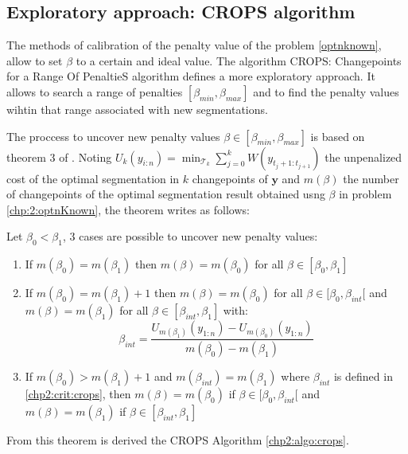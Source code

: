 \subsection{Exploratory approach: CROPS algorithm}

The methods of calibration of the penalty value of the problem \ref{optnknown}, allow to set $\beta$ to a certain and ideal value. The algorithm CROPS: Changepoints for a Range Of PenaltieS algorithm defines a more exploratory approach. It allows to search a range of penalties $[\beta_{min},\beta_{max}]$ and to find the penalty values wihtin that range associated with new segmentations.  

The proccess to uncover new penalty values $\beta \in [\beta_{min},\beta_{max}]$ is based on theorem 3 of \cite{haynes2017}. Noting $U_k(y_{i:n}) = \min_{\mathcal{T}_k} \sum_{j = 0}^k W(y _{t_j+1:t_{j+1}})$ the unpenalized cost of the optimal segmentation in $k$ changepoints of $\bm y$ and $m(\beta)$ the number of changepoints of the optimal segmentation result obtained usng $\beta$ in problem \ref{chp:2:optnKnown}, the theorem writes as follows:

\begin{theorem}
Let $\beta_0 < \beta_1$, 3 cases are possible to uncover new penalty values:
\begin{enumerate}
  \item If $m(\beta_0) = m(\beta_1)$ then $m(\beta) = m(\beta_0)$ for all $\beta \in [\beta_0,\beta_1]$
  \item If $m(\beta_0) = m(\beta_1)+1$ then $m(\beta) = m(\beta_0)$ for all $\beta\in[\beta_0,\beta_{int}[$ and $m(\beta) = m(\beta_1)$ for all $\beta\in[\beta_{int},\beta_1]$ with:
  \begin{equation}\label{chp2:crit:crops}
    \beta_{int} = \frac{U_{m(\beta_1)}(y_{1:n})-U_{m(\beta_0)}(y_{1:n})}{m(\beta_0)-m(\beta_1)}
  \end{equation}
  \item If $m(\beta_0) > m(\beta_1)+1$ and $m(\beta_{int}) = m(\beta_1)$ where $\beta_{int}$ is defined in \ref{chp2:crit:crops}, then $m(\beta) = m(\beta_0)$ if $\beta\in[\beta_0,\beta_{int}[$ and $m(\beta) = m(\beta_1)$ if $\beta\in [\beta_{int},\beta_1]$
\end{enumerate}
\end{theorem} 

From this theorem is derived the CROPS Algorithm \ref{chp2:algo:crops}.  

